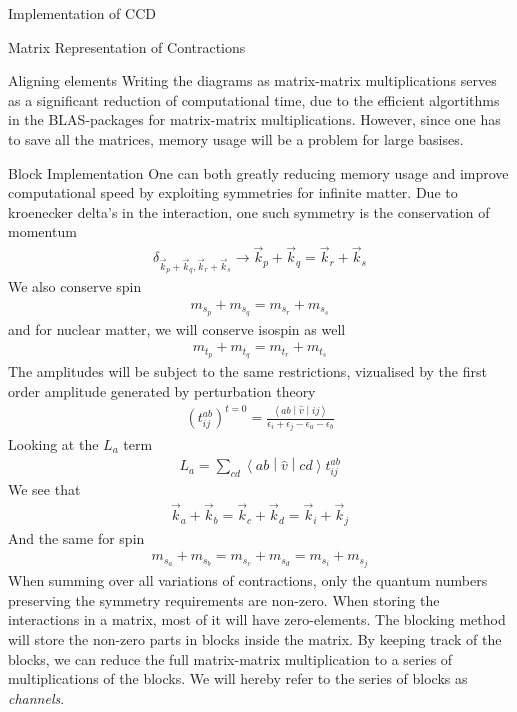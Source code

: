 \documentclass[twoside,english]{uiofysmaster}
\begin{document}
\begin{chapter}{Implementation of CCD}
\begin{section}{Matrix Representation of Contractions}
\begin{subsection}{Aligning elements}
			Writing the diagrams as matrix-matrix multiplications serves as a significant reduction of computational time, due to the efficient algortithms in the BLAS-packages for matrix-matrix multiplications. However, since one has to save all the matrices, memory usage will be a problem for large basises. 
		\end{subsection}

	\end{section}

	\begin{section}{Block Implementation}
		One can both greatly reducing memory usage and improve computational speed by exploiting symmetries for infinite matter. Due to kroenecker delta's in the interaction, one such symmetry is the conservation of momentum
		\begin{align}
			\delta_{\vec k_p + \vec k_q, \vec k_r + \vec k_s} \rightarrow \vec k_p + \vec k_q = \vec k_r + \vec k_s
		\end{align}
		We also conserve spin 
		\begin{align}
			m_{s_p} + m_{s_q} = m_{s_r} + m_{s_s}
		\end{align}
		and for nuclear matter, we will conserve isospin as well
		\begin{align}
			m_{t_p} + m_{t_q} = m_{t_r} + m_{t_s}
		\end{align}
		The amplitudes will be subject to the same restrictions, vizualised by the first order amplitude generated by perturbation theory
		\begin{align}
			(t_{ij}^{ab})^{t=0} = \frac{\left<ab\middle|\hat v\middle|ij\right>}{\epsilon_i + \epsilon_j - \epsilon_a - \epsilon_b}
		\end{align}
		Looking at the $L_a$ term
		\begin{align}
			L_a = \sum_{cd} \left<ab\middle|\hat v\middle|cd\right> t_{ij}^{ab}
		\end{align}
		We see that 
		\begin{align}
			\vec k_a + \vec k_b = \vec k_c + \vec k_d = \vec k_i + \vec k_j
		\end{align}
		And the same for spin
		\begin{align}
			m_{s_a} + m_{s_b} = m_{s_c} + m_{s_d} = m_{s_i} + m_{s_j} 
		\end{align}
		When summing over all variations of contractions, only the quantum numbers preserving the symmetry requirements are non-zero. When storing the interactions in a matrix, most of it will have zero-elements. The blocking method will store the non-zero parts in blocks inside the matrix. By keeping track of the blocks, we can reduce the full matrix-matrix multiplication to a series of multiplications of the blocks. We will hereby refer to the series of blocks as \textit{channels}.


\end{section}
\end{chapter}
\end{document}
